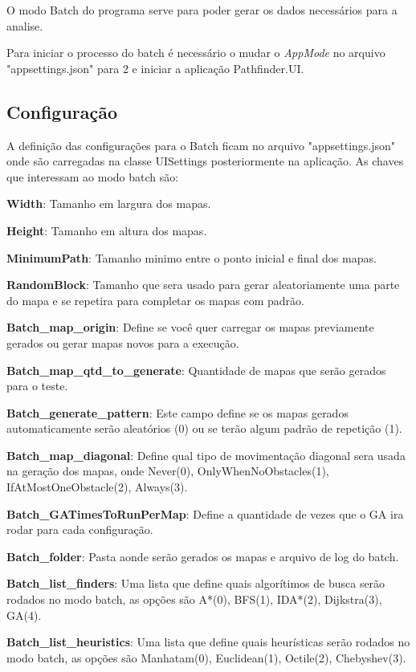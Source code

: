 O modo Batch do programa serve para poder gerar os dados necessários para a analise.
 
 Para iniciar o processo do batch é necessário o mudar o \textit{AppMode} no arquivo "appsettings.json" para 2 e iniciar a aplicação Pathfinder.UI.
 
 
 \subsection{Configuração}
 
 A definição das configurações para o Batch ficam no arquivo "appsettings.json" onde são carregadas na classe UISettings posteriormente na aplicação. As chaves que interessam ao modo batch são:
 
 \textbf{Width}: Tamanho em largura dos mapas.
 
 \textbf{Height}: Tamanho em altura dos mapas.
 
 \textbf{MinimumPath}: Tamanho minimo entre o ponto inicial e final dos mapas.
 
 \textbf{RandomBlock}: Tamanho que sera usado para gerar aleatoriamente uma parte do mapa e se repetira para completar os mapas com padrão.
 
 \textbf{Batch\_map\_origin}: Define se você quer carregar os mapas previamente gerados ou gerar mapas novos para a execução.
 
 \textbf{Batch\_map\_qtd\_to\_generate}: Quantidade de mapas que serão gerados para o teste.
 
 \textbf{Batch\_generate\_pattern}: Este campo define se os mapas gerados automaticamente serão aleatórios (0) ou se terão algum padrão de repetição (1).
 
 \textbf{Batch\_map\_diagonal}: Define qual tipo de movimentação diagonal sera usada na geração dos mapas, onde Never(0), OnlyWhenNoObstacles(1), IfAtMostOneObstacle(2), Always(3).
 
 \textbf{Batch\_GATimesToRunPerMap}: Define a quantidade de vezes que o GA ira rodar para cada configuração.
 
 \textbf{Batch\_folder}: Pasta aonde serão gerados os mapas e arquivo de log do batch.
 
 \textbf{Batch\_list\_finders}: Uma lista que define quais algorítimos de busca serão rodados no modo batch, as opções são  A\**(0), BFS(1), IDA\**(2), Dijkstra(3), GA(4).
 
 \textbf{Batch\_list\_heuristics}: Uma lista que define quais heurísticas serão rodados no modo batch, as opções são Manhatam(0), Euclidean(1), Octile(2), Chebyshev(3).
 
